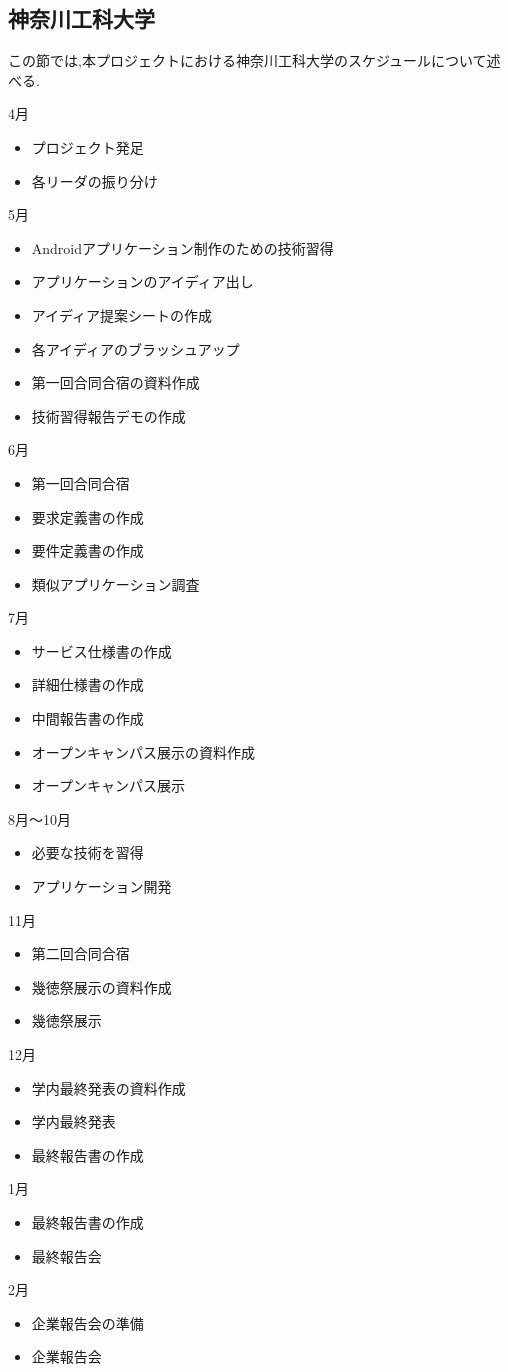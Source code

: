 \subsection{神奈川工科大学}
\par この節では,本プロジェクトにおける神奈川工科大学のスケジュールについて述べる.

4月
\begin{itemize}
\item プロジェクト発足
\item 各リーダの振り分け
\end{itemize}
5月
\begin{itemize}
\item Androidアプリケーション制作のための技術習得
\item アプリケーションのアイディア出し
\item アイディア提案シートの作成
\item 各アイディアのブラッシュアップ
\item 第一回合同合宿の資料作成
\item 技術習得報告デモの作成
\end{itemize}
6月
\begin{itemize}
\item 第一回合同合宿
\item 要求定義書の作成
\item 要件定義書の作成
\item 類似アプリケーション調査
\end{itemize}
7月
\begin{itemize}
\item サービス仕様書の作成
\item 詳細仕様書の作成
\item 中間報告書の作成
\item オープンキャンパス展示の資料作成
\item オープンキャンパス展示
\end{itemize}
8月～10月
\begin{itemize}
\item 必要な技術を習得
\item アプリケーション開発
\end{itemize}
11月
\begin{itemize}
\item 第二回合同合宿
\item 幾徳祭展示の資料作成
\item 幾徳祭展示
\end{itemize}
12月
\begin{itemize}
\item 学内最終発表の資料作成
\item 学内最終発表
\item 最終報告書の作成
\end{itemize}
1月
\begin{itemize}
\item 最終報告書の作成
\item 最終報告会
\end{itemize}
2月
\begin{itemize}
\item 企業報告会の準備
\item 企業報告会
\end{itemize}
